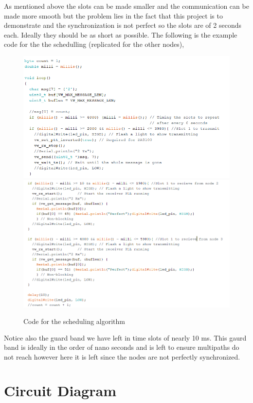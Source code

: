\documentclass[12pt]{article}
\begin{document}
As mentioned above the slots can be made smaller and the communication can be made more smooth but the problem lies in the fact that this project is to demonstrate and the synchronization is not perfect so the slots are of 2 seconds each. Ideally they should be as short as possible. The following is the example code for the the schedulling (replicated for the other nodes),
\newpage

 \begin{figure}[h]
 \centering
 \includegraphics[scale = 0.4]{algo1.PNG}
  \includegraphics[scale = 0.5]{algo2.PNG}
 \caption{Code for the scheduling algorithm}
 \end{figure}
 
 Notice also the guard band we have left in time slots of nearly 10 ms. This gaurd band is ideally in the order of nano seconds and is left to ensure multipaths do not reach however here it is left since the nodes are not perfectly synchronized. 

\section{Circuit Diagram}
 
\end{document}
